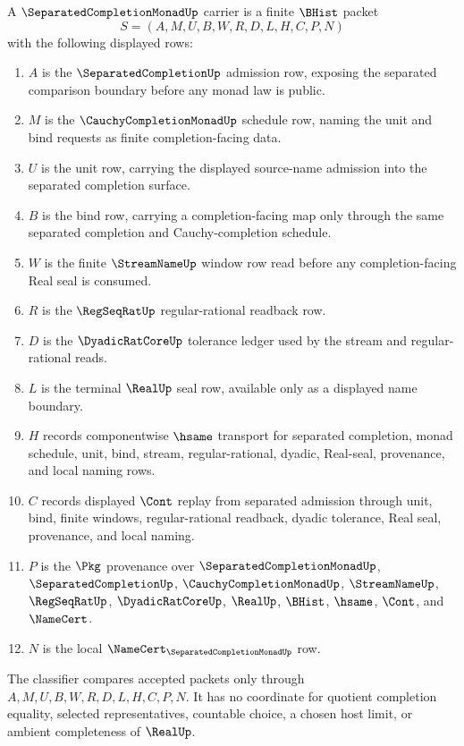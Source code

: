 \begin{definition}
\label{def:separated-completion-monad-carrier}
A $\SeparatedCompletionMonadUp$ carrier is a finite $\BHist$ packet
$$
S=(A,M,U,B,W,R,D,L,H,C,P,N)
$$
with the following displayed rows:
\begin{enumerate}
\item $A$ is the $\SeparatedCompletionUp$ admission row, exposing the separated comparison boundary before any monad law is public.
\item $M$ is the $\CauchyCompletionMonadUp$ schedule row, naming the unit and bind requests as finite completion-facing data.
\item $U$ is the unit row, carrying the displayed source-name admission into the separated completion surface.
\item $B$ is the bind row, carrying a completion-facing map only through the same separated completion and Cauchy-completion schedule.
\item $W$ is the finite $\StreamNameUp$ window row read before any completion-facing Real seal is consumed.
\item $R$ is the $\RegSeqRatUp$ regular-rational readback row.
\item $D$ is the $\DyadicRatCoreUp$ tolerance ledger used by the stream and regular-rational reads.
\item $L$ is the terminal $\RealUp$ seal row, available only as a displayed name boundary.
\item $H$ records componentwise $\hsame$ transport for separated completion, monad schedule, unit, bind, stream, regular-rational, dyadic, Real-seal, provenance, and local naming rows.
\item $C$ records displayed $\Cont$ replay from separated admission through unit, bind, finite windows, regular-rational readback, dyadic tolerance, Real seal, provenance, and local naming.
\item $P$ is the $\Pkg$ provenance over $\SeparatedCompletionMonadUp$, $\SeparatedCompletionUp$, $\CauchyCompletionMonadUp$, $\StreamNameUp$, $\RegSeqRatUp$, $\DyadicRatCoreUp$, $\RealUp$, $\BHist$, $\hsame$, $\Cont$, and $\NameCert$.
\item $N$ is the local $\NameCert_{\SeparatedCompletionMonadUp}$ row.
\end{enumerate}
The classifier compares accepted packets only through $A,M,U,B,W,R,D,L,H,C,P,N$. It has no coordinate for quotient completion equality, selected representatives, countable choice, a chosen host limit, or ambient completeness of $\RealUp$.
\end{definition}

